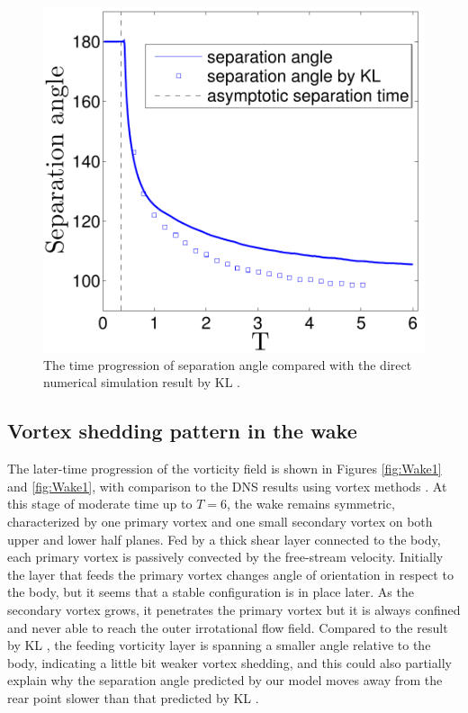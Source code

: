 \begin{figure}
 \begin{center}
 \includegraphics[width=12cm]{./Figures/results/static/separation_angle.pdf}
 \end{center}
 \caption[Evolution of separation angle]{The time progression of separation angle compared with the direct numerical simulation result by KL \cite{koumoutsakos1995high}.}
 \label{fig:SeparationAngle}
\end{figure}


\subsection{Vortex shedding pattern in the wake}

The later-time progression of the vorticity field is shown in Figures \ref{fig:Wake1} and \ref{fig:Wake1}, with comparison to the DNS results using vortex methods \cite{koumoutsakos1995high}.
At this stage of moderate time up to $T = 6$, the wake remains symmetric,  characterized by one primary vortex and one small secondary vortex on both upper and lower half planes. 
Fed by a thick shear layer connected to the body, each primary vortex is passively convected by the free-stream velocity.
Initially the layer that feeds the primary vortex changes angle of orientation in respect to the body, but it seems that a stable configuration is in place later.
As the secondary vortex grows, it penetrates the primary vortex but it is always confined and never able to reach the outer irrotational flow field.
Compared to the result by KL \cite{koumoutsakos1995high}, the feeding vorticity layer is spanning a smaller angle relative to the body, indicating a little bit weaker vortex shedding, and this could also partially explain why the separation angle predicted by our model moves away from the rear point slower than that predicted by KL \cite{koumoutsakos1995high}.



